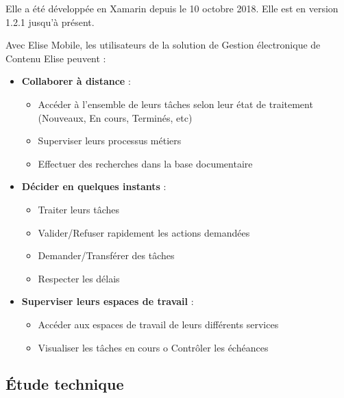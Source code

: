 Elle a été développée en Xamarin depuis le 10 octobre 2018. Elle est en version 1.2.1 jusqu'à présent.

Avec Elise Mobile, les utilisateurs de la solution de Gestion électronique de Contenu Elise peuvent :

\begin{itemize}

\item \textbf{Collaborer à distance} : 
  \begin{itemize}
  \item Accéder à l'ensemble de leurs tâches selon leur état de traitement (Nouveaux, En cours, Terminés, etc)
  \item Superviser leurs processus métiers
  \item Effectuer des recherches dans la base documentaire
  \end{itemize}
\item \textbf{Décider en quelques instants} :
  \begin{itemize}
  \item Traiter leurs tâches
  \item Valider/Refuser rapidement les actions demandées
  \item Demander/Transférer des tâches
  \item Respecter les délais
  \end{itemize}
\item \textbf{Superviser leurs espaces de travail} :
  \begin{itemize}
    \item Accéder aux espaces de travail de leurs différents services
    \item Visualiser les tâches en cours o Contrôler les échéances
  \end{itemize}
\end{itemize}

\subsection{Étude technique}
